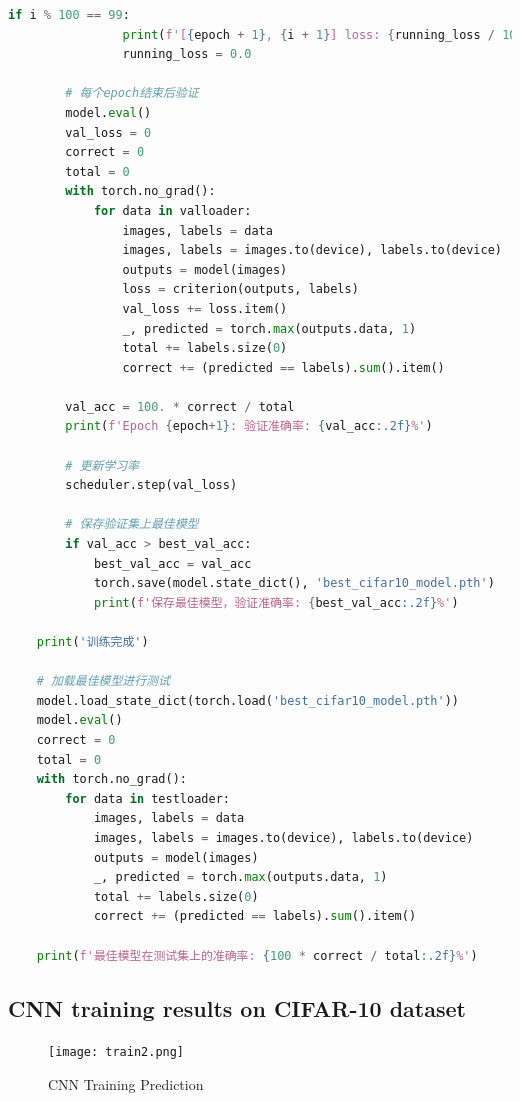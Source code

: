 \documentclass[UTF8]{report}
\theoremstyle{MyLineTheoremStyle} %
\theoremstyle{MyBlockTheoremStyle} %
\theoremstyle{MySubsubsectionStyle} %
\begin{document}
\begin{lstlisting}[language=python, caption={神经网络CNN训练（纯手写）}, label={lst:cnn_train_handwritten}]
            if i % 100 == 99:
                print(f'[{epoch + 1}, {i + 1}] loss: {running_loss / 100:.3f} | acc: {100.*correct/total:.2f}%')
                running_loss = 0.0
        
        # 每个epoch结束后验证
        model.eval()
        val_loss = 0
        correct = 0
        total = 0
        with torch.no_grad():
            for data in valloader:
                images, labels = data
                images, labels = images.to(device), labels.to(device)
                outputs = model(images)
                loss = criterion(outputs, labels)
                val_loss += loss.item()
                _, predicted = torch.max(outputs.data, 1)
                total += labels.size(0)
                correct += (predicted == labels).sum().item()
        
        val_acc = 100. * correct / total
        print(f'Epoch {epoch+1}: 验证准确率: {val_acc:.2f}%')
        
        # 更新学习率
        scheduler.step(val_loss)
        
        # 保存验证集上最佳模型
        if val_acc > best_val_acc:
            best_val_acc = val_acc
            torch.save(model.state_dict(), 'best_cifar10_model.pth')
            print(f'保存最佳模型，验证准确率: {best_val_acc:.2f}%')

    print('训练完成')

    # 加载最佳模型进行测试
    model.load_state_dict(torch.load('best_cifar10_model.pth'))
    model.eval()
    correct = 0
    total = 0
    with torch.no_grad():
        for data in testloader:
            images, labels = data
            images, labels = images.to(device), labels.to(device)
            outputs = model(images)
            _, predicted = torch.max(outputs.data, 1)
            total += labels.size(0)
            correct += (predicted == labels).sum().item()

    print(f'最佳模型在测试集上的准确率: {100 * correct / total:.2f}%')
\end{lstlisting}


\subsection{CNN training results on CIFAR-10 dataset}


\begin{figure}[H]
    \centering
    \texttt{[image: train2.png]}
    \caption{CNN Training Prediction}
    \label{fig:cnn_validation_accuracy}
\end{figure}
\end{document}
